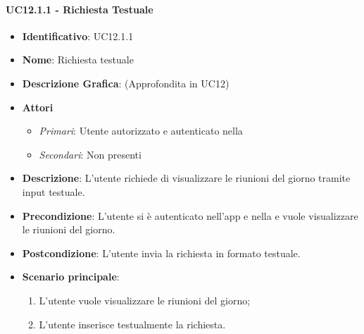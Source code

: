 \paragraph{UC12.1.1 - Richiesta Testuale }
\begin{itemize}
	\item \textbf{Identificativo}: UC12.1.1
	\item \textbf{Nome}: Richiesta testuale
	\item\textbf{Descrizione Grafica}: (Approfondita in UC12)
	\item \textbf{Attori}
	\begin{itemize} 
		\item \textit{Primari}: Utente autorizzato e autenticato nella 
		\item \textit{Secondari}: Non presenti
	\end{itemize}
	\item \textbf{Descrizione}: L'utente richiede di visualizzare le riunioni del giorno tramite input testuale.
	\item \textbf{Precondizione}: L'utente si è autenticato nell'app e nella  e vuole visualizzare le riunioni del giorno.
	\item \textbf{Postcondizione}: L'utente invia la richiesta in formato testuale.
	\item \textbf{Scenario principale}:
	\begin{enumerate}
		\item L'utente vuole visualizzare le riunioni del giorno;
		\item L'utente inserisce testualmente la richiesta.
	\end{enumerate}
\end{itemize}

